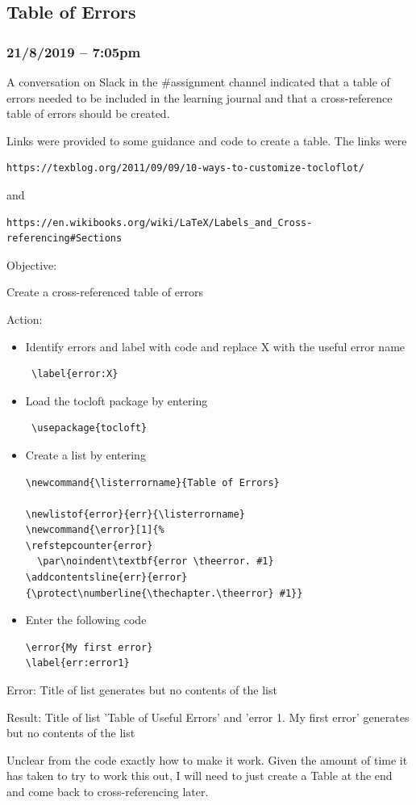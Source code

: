 \documentclass{article}
\begin{document}
\subsection{Table of Errors}\label{sec: Customlist}
\subsubsection*{21/8/2019 – 7:05pm}
A conversation on Slack in the \#assignment channel indicated that a table of errors needed to be included in the learning journal and that a cross-reference table of errors should be created.\par
Links were provided to some guidance and code to create a table. The links were \begin{verbatim}
https://texblog.org/2011/09/09/10-ways-to-customize-tocloflot/\end{verbatim} and \begin{verbatim}https://en.wikibooks.org/wiki/LaTeX/Labels_and_Cross-referencing#Sections\end{verbatim}\par
Objective:\par
Create a cross-referenced table of errors\par
Action:\par
\begin{itemize}
    \item Identify errors and label with code and replace X with the useful error name \begin{verbatim} \label{error:X}    \end{verbatim} 
    \item Load the tocloft package by entering \begin{verbatim} \usepackage{tocloft}\end{verbatim} 
    \item Create a list by entering \begin{verbatim}\newcommand{\listerrorname}{Table of Errors}

\newlistof{error}{err}{\listerrorname}
\newcommand{\error}[1]{%
\refstepcounter{error}
  \par\noindent\textbf{error \theerror. #1}
\addcontentsline{err}{error}
{\protect\numberline{\thechapter.\theerror} #1}}\end{verbatim} 
\item Enter the following code \begin{verbatim}
\error{My first error}
\label{err:error1}
\end{verbatim} 
\end{itemize}
Error: Title of list generates but no contents of the list\par
Result: Title of list 'Table of Useful Errors' and 'error 1. My first error' generates but no contents of the list\par
Unclear from the code exactly how to make it work. Given the amount of time it has taken to try to work this out, I will need to just create a Table at the end and come back to cross-referencing later.
\end{document}
